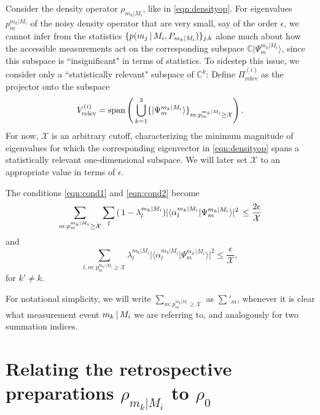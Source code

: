Consider the density operator $\rho_{m_k\vert M_i}$, like in \ref{eqn:densityop}. For eigenvalues $p_m^{m_k\vert M_i}$ of the noisy density operator that are very small, say of the order $\epsilon$, we cannot infer from the statistics $\{p(m_j\thinspace\vert\thinspace M_i, P_{m_k\vert M_i})\}_{j,k}$ alone much about how the accessible measurements act on the corresponding subspace $\mathbb{C}\vert \Psi_m^{m_k\vert M_i}\rangle$, since this subspace is ``insignificant" in terms of statistics. To sidestep this issue, we consider only a ``statistically relevant" subspace of $\mathbb{C}^k$:
Define $\Pi_{\text{relev}}^{(i)}$ as the projector onto the subspace 
\begin{equation}
\label{eqn:relevsubspace}
V_{\text{relev}}^{(i)}=\operatorname{span}\left(\thinspace\bigcup_{k=1}^3\{\vert \Psi_m^{m_k\vert M_i}\rangle\}_{m:p_m^{m_k\vert M_i}\geq\mathcal{X}}\right).
\end{equation}
For now, $\mathcal{X}$ is an arbitrary cutoff, characterizing the minimum magnitude of eigenvalues for which the corresponding eigenvector in \ref{eqn:densityop} spans a statistically relevant one-dimensional subspace. We will later set $\mathcal{X}$ to an appropriate value in terms of $\epsilon$. 

The conditions \ref{eqn:cond1} and \ref{eqn:cond2} become
\begin{equation}
\label{eqn:cond1new}
\sum_{m:p_m^{m_k\vert M_i}\geq \mathcal{X}} \sum_l \,(\thinspace 1- \lambda_l^{m_k\vert M_i}) \vert \langle \alpha_l^{m_k\vert M_i}\vert \Psi_m^{m_k\vert M_i} \rangle \vert^2\thinspace \leq \frac{2\epsilon}{\mathcal{X}}
\end{equation}
and
\begin{equation}
\label{eqn:cond2new}
\sum_{l,m:p_m^{m_{k'}\vert M_i}\geq \mathcal{X}} \lambda_l^{m_k\vert M_i} \vert \langle \alpha_l^{m_k\vert M_i}\vert \Psi_m^{m_{k'}\vert M_i} \rangle \vert^2\leq \frac{\epsilon}{\mathcal{X}},
\end{equation}
for $k'\neq k$.

For notational simplicity, we will write $\sum_{m:p_m^{m_k\vert M_i}\geq \mathcal{X}}$ as $\sum'_m$, whenever it is clear what measurement event $m_k\thinspace\vert\thinspace M_i$ we are referring to, and analogously for two summation indices.

\section{Relating the retrospective preparations $\rho_{m_k \vert M_i}$ to $\rho_0$}

